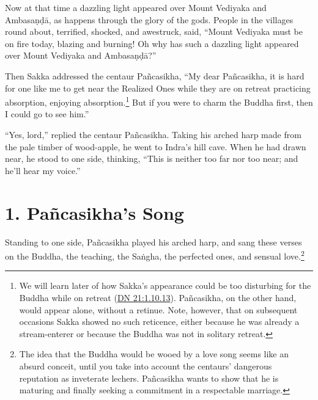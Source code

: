 \documentclass[12pt,openany]{book}%
\begin{document}
Now at that time a dazzling light appeared over Mount Vediyaka and \textsanskrit{Ambasaṇḍā}, as happens through the glory of the gods. People in the villages round about, terrified, shocked, and awestruck, said, “Mount Vediyaka must be on fire today, blazing and burning! Oh why has such a dazzling light appeared over Mount Vediyaka and \textsanskrit{Ambasaṇḍā}?” 

Then Sakka addressed the centaur \textsanskrit{Pañcasikha}, “My dear \textsanskrit{Pañcasikha}, it is hard for one like me to get near the Realized Ones while they are on retreat practicing absorption, enjoying absorption.\footnote{We will learn later of how Sakka’s appearance could be too disturbing for the Buddha while on retreat (\href{https://suttacentral.net/dn21/en/sujato\#1.10.13}{DN 21:1.10.13}). \textsanskrit{Pañcasikha}, on the other hand, would appear alone, without a retinue. Note, however, that on subsequent occasions Sakka showed no such reticence, either because he was already a stream-enterer or because the Buddha was not in solitary retreat. } But if you were to charm the Buddha first, then I could go to see him.” 

“Yes, lord,” replied the centaur \textsanskrit{Pañcasikha}. Taking his arched harp made from the pale timber of wood-apple, he went to Indra’s hill cave. When he had drawn near, he stood to one side, thinking, “This is neither too far nor too near; and he’ll hear my voice.” 

\section*{1. \textsanskrit{Pañcasikha}’s Song }

Standing to one side, \textsanskrit{Pañcasikha} played his arched harp, and sang these verses on the Buddha, the teaching, the \textsanskrit{Saṅgha}, the perfected ones, and sensual love.\footnote{The idea that the Buddha would be wooed by a love song seems like an absurd conceit, until you take into account the centaurs’ dangerous reputation as inveterate lechers. \textsanskrit{Pañcasikha} wants to show that he is maturing and finally seeking a commitment in a respectable marriage. } 
\end{document}
